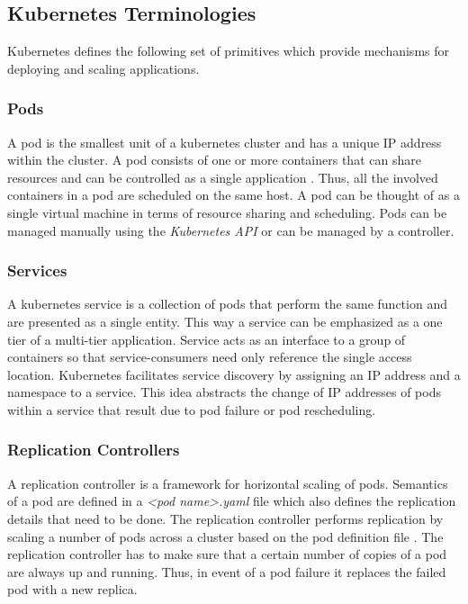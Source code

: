 \documentclass[9pt,twocolumn,twoside]{../../styles/osajnl}
\begin{document}
{\subsection{Kubernetes Terminologies}
Kubernetes defines the following set of primitives which provide
mechanisms for deploying and scaling applications.

\subsubsection{Pods}
A pod is the smallest unit of a kubernetes cluster and has a unique
IP address within the cluster. A pod consists of one or more
containers that can share resources and can be controlled as a single
application \cite{www-wiki-kubernetes}
\cite{www-kubernetes-digitalocean}. Thus, all the involved containers
in a pod are scheduled on the same host. A pod can be thought of as a
single virtual machine in terms of resource sharing and scheduling.
Pods can be managed manually using the \emph{Kubernetes API} or can be
managed by a controller.

\subsubsection{Services}
A kubernetes service is a collection of pods that perform the same
function and are presented as a single entity. This way a service can
be emphasized as a one tier of a multi-tier application. Service acts
as an interface to a group of containers so that service-consumers
need only reference the single access location. Kubernetes facilitates
service discovery by assigning an IP address and a namespace to
a service. This idea abstracts the change of IP addresses of pods
within a service that result due to pod failure or pod rescheduling.

\subsubsection{Replication Controllers}
A replication controller is a framework for horizontal scaling of
pods. Semantics of a pod are defined in a \emph{<pod\textunderscore
name>.yaml} file which also defines the replication details that need
to be done. The replication controller performs replication by scaling
a number of pods across a cluster based on the pod definition file
\cite{www-wiki-kubernetes}. The replication controller has to make
sure that a certain number of copies of a pod are always up and
running. Thus, in event of a pod failure it replaces the failed pod
with a new replica.

}
\end{document}
